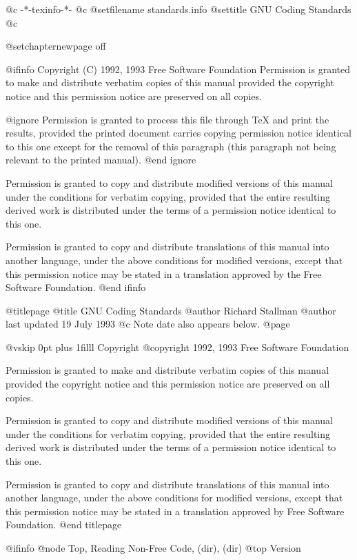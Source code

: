  @c -*-texinfo-*-
@c %
@setfilename standards.info
@settitle GNU Coding Standards
@c %

@setchapternewpage off

@ifinfo
Copyright (C) 1992, 1993 Free Software Foundation
Permission is granted to make and distribute verbatim copies of
this manual provided the copyright notice and this permission notice
are preserved on all copies.

@ignore
Permission is granted to process this file through TeX and print the
results, provided the printed document carries copying permission
notice identical to this one except for the removal of this paragraph
(this paragraph not being relevant to the printed manual).
@end ignore

Permission is granted to copy and distribute modified versions of this
manual under the conditions for verbatim copying, provided that the entire
resulting derived work is distributed under the terms of a permission
notice identical to this one.

Permission is granted to copy and distribute translations of this manual
into another language, under the above conditions for modified versions,
except that this permission notice may be stated in a translation approved
by the Free Software Foundation.
@end ifinfo

@titlepage
@title GNU Coding Standards
@author Richard Stallman
@author last updated 19 July 1993
@c Note date also appears below.
@page

@vskip 0pt plus 1filll
Copyright @copyright{} 1992, 1993 Free Software Foundation

Permission is granted to make and distribute verbatim copies of
this manual provided the copyright notice and this permission notice
are preserved on all copies.

Permission is granted to copy and distribute modified versions of this
manual under the conditions for verbatim copying, provided that the entire
resulting derived work is distributed under the terms of a permission
notice identical to this one.

Permission is granted to copy and distribute translations of this manual
into another language, under the above conditions for modified versions,
except that this permission notice may be stated in a translation approved
by Free Software Foundation.
@end titlepage

@ifinfo
@node Top, Reading Non-Free Code, (dir), (dir)
@top Version

